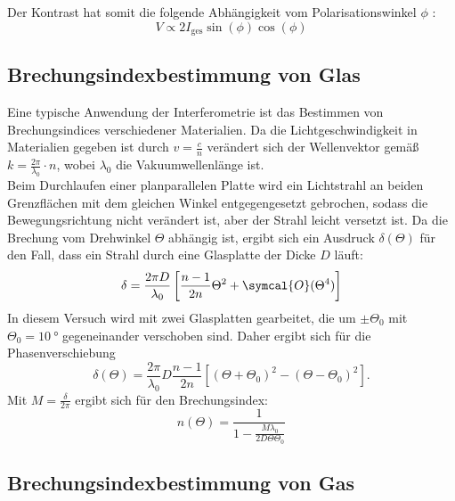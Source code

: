 \noindent Der Kontrast hat somit die folgende Abhängigkeit vom Polarisationswinkel $\phi$ :
\begin{equation}
    V \propto 2 I_{\text{ges}} \sin(\phi)\cos(\phi) \label{eqn:kontrastphi}
\end{equation}


\subsection{Brechungsindexbestimmung von Glas}

\noindent Eine typische Anwendung der Interferometrie ist das Bestimmen von Brechungsindices verschiedener Materialien. Da die Lichtgeschwindigkeit in Materialien gegeben ist durch
$ v = \frac{c}{n}$ verändert sich der Wellenvektor gemäß $ k = \frac{2 \pi}{\lambda_0} \cdot n$, wobei $\lambda_0$ die Vakuumwellenlänge ist. \\
Beim Durchlaufen einer planparallelen Platte wird ein Lichtstrahl an beiden Grenzflächen mit dem gleichen Winkel entgegengesetzt gebrochen, sodass die Bewegungsrichtung nicht
verändert ist, aber der Strahl leicht versetzt ist. Da die Brechung vom Drehwinkel $\Theta$ abhängig ist, ergibt sich ein Ausdruck $\delta(\Theta)$ für den Fall, dass ein Strahl durch 
eine Glasplatte der Dicke $D$ läuft:
\begin{equation*}
    \delta = \frac{2 \pi D}{\lambda_0} \left[ \frac{n-1}{2n} \Theta^2 + \symcal{O}(\Theta ^4)\right]
\end{equation*}
In diesem Versuch wird mit zwei Glasplatten gearbeitet, die um $ \pm \Theta_0$ mit $\Theta_0 = \SI{10}{\degree}$ gegeneinander verschoben sind. Daher ergibt 
sich für die Phasenverschiebung 
\begin{equation*}
    \delta(\Theta) = \frac{2 \pi}{\lambda_0} D \frac{n-1}{2n} \left[ (\Theta + \Theta_0)^2 - (\Theta - \Theta_0)^2 \right]. 
\end{equation*}
Mit $ M = \frac{\delta}{2 \pi} $ ergibt sich für den Brechungsindex:
\begin{equation}
    n(\Theta) = \frac{1}{1 - \frac{M \lambda_0}{2 D \Theta \Theta_0}} \label{eqn:n_Glas}
\end{equation}


\subsection{Brechungsindexbestimmung von Gas}


